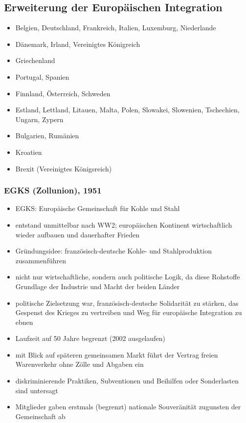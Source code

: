 \subsection{Erweiterung der Europäischen Integration}
\begin{itemize}
	\item{} Belgien, Deutschland, Frankreich, Italien, Luxemburg, Niederlande
	\item{}  Dänemark, Irland, Vereinigtes Königreich
	\item{} Griechenland
	\item{} Portugal, Spanien
	\item{} Finnland, Österreich, Schweden
	\item{} Estland, Lettland, Litauen, Malta, Polen, Slowakei, Slowenien, Tschechien, Ungarn, Zypern
	\item{} Bulgarien, Rumänien
	\item{} Kroatien
	\item{} Brexit (Vereinigtes Königsreich)
\end{itemize}

\subsubsection{EGKS (Zollunion), 1951}
\begin{itemize}
	\item EGKS: Europäische Gemeinschaft für Kohle und Stahl
	\item entstand unmittelbar nach WW2; europäischen Kontinent wirtschaftlich wieder aufbauen und dauerhafter Frieden
	\item Gründungsidee: französisch-deutsche Kohle- und Stahlproduktion zusammenführen
	\item nicht nur wirtschaftliche, sondern auch politische Logik, da diese Rohstoffe Grundlage der Industrie und Macht der beiden Länder
	\item politische Zielsetzung war, französisch-deutsche Solidarität zu stärken, das Gespenst des Krieges zu vertreiben und Weg für europäische Integration zu ebnen
	\item Laufzeit auf 50 Jahre begrenzt (2002 ausgelaufen)
	\item mit Blick auf späteren gemeinsamen Markt führt der Vertrag freien Warenverkehr ohne Zölle und Abgaben ein
	\item diskriminierende Praktiken, Subventionen und Beihilfen oder Sonderlasten sind untersagt
	\item Mitglieder gaben erstmals (begrenzt) nationale Souveränität zugunsten der Gemeinschaft ab
\end{itemize}

